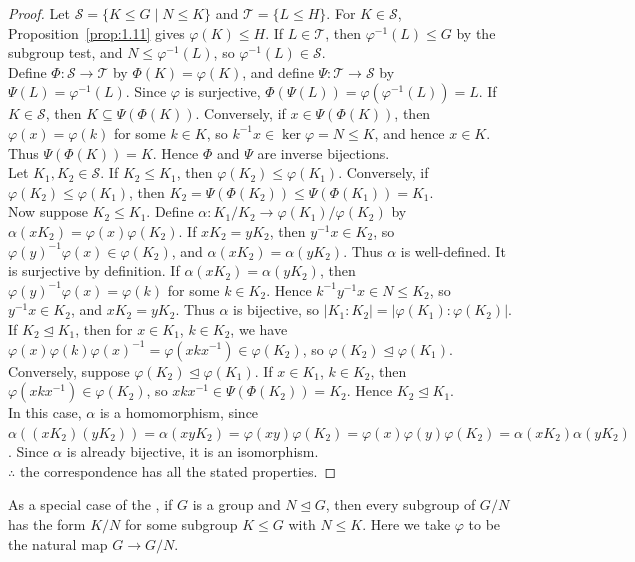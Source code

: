\documentclass[../Odyssey_Project.tex]{subfiles}
\begin{document}
\begin{proof}
    Let \(\mathcal{S} = \{K \leq G \mid N \leq K\}\) and \(\mathcal{T} = \{L \leq H\}\). For \(K \in \mathcal{S}\), Proposition~\ref{prop:1.11} gives \(\varphi(K) \leq H\). If \(L \in \mathcal{T}\), then \(\varphi^{-1}(L) \leq G\) by the subgroup test, and \(N \leq \varphi^{-1}(L)\), so \(\varphi^{-1}(L) \in \mathcal{S}\). \\
    Define \(\Phi \colon \mathcal{S} \to \mathcal{T}\) by \(\Phi(K) = \varphi(K)\), and define \(\Psi \colon \mathcal{T} \to \mathcal{S}\) by \(\Psi(L) = \varphi^{-1}(L)\). Since \(\varphi\) is surjective, \(\Phi(\Psi(L)) = \varphi(\varphi^{-1}(L)) = L\). If \(K \in \mathcal{S}\), then \(K \subseteq \Psi(\Phi(K))\). Conversely, if \(x \in \Psi(\Phi(K))\), then \(\varphi(x) = \varphi(k)\) for some \(k \in K\), so \(k^{-1}x \in \ker\varphi = N \leq K\), and hence \(x \in K\). Thus \(\Psi(\Phi(K)) = K\). Hence \(\Phi\) and \(\Psi\) are inverse bijections. \\
    Let \(K_1,K_2 \in \mathcal{S}\). If \(K_2 \leq K_1\), then \(\varphi(K_2) \leq \varphi(K_1)\). Conversely, if \(\varphi(K_2) \leq \varphi(K_1)\), then \(K_2 = \Psi(\Phi(K_2)) \leq \Psi(\Phi(K_1)) = K_1\). \\
    Now suppose \(K_2 \leq K_1\). Define \(\alpha \colon K_1/K_2 \to \varphi(K_1)/\varphi(K_2)\) by \(\alpha(xK_2) = \varphi(x)\varphi(K_2)\). If \(xK_2 = yK_2\), then \(y^{-1}x \in K_2\), so \(\varphi(y)^{-1}\varphi(x) \in \varphi(K_2)\), and \(\alpha(xK_2) = \alpha(yK_2)\). Thus \(\alpha\) is well-defined. It is surjective by definition. If \(\alpha(xK_2) = \alpha(yK_2)\), then \(\varphi(y)^{-1}\varphi(x) = \varphi(k)\) for some \(k \in K_2\). Hence \(k^{-1}y^{-1}x \in N \leq K_2\), so \(y^{-1}x \in K_2\), and \(xK_2 = yK_2\). Thus \(\alpha\) is bijective, so \(|K_1:K_2| = |\varphi(K_1):\varphi(K_2)|\). \\
    If \(K_2 \trianglelefteq K_1\), then for \(x \in K_1\), \(k \in K_2\), we have \(\varphi(x)\varphi(k)\varphi(x)^{-1} = \varphi(xkx^{-1}) \in \varphi(K_2)\), so \(\varphi(K_2) \trianglelefteq \varphi(K_1)\). Conversely, suppose \(\varphi(K_2) \trianglelefteq \varphi(K_1)\). If \(x \in K_1\), \(k \in K_2\), then \(\varphi(xkx^{-1}) \in \varphi(K_2)\), so \(xkx^{-1} \in \Psi(\Phi(K_2)) = K_2\). Hence \(K_2 \trianglelefteq K_1\). \\
    In this case, \(\alpha\) is a homomorphism, since \(\alpha((xK_2)(yK_2)) = \alpha(xyK_2) = \varphi(xy)\varphi(K_2) = \varphi(x)\varphi(y)\varphi(K_2) = \alpha(xK_2)\alpha(yK_2)\). Since \(\alpha\) is already bijective, it is an isomorphism. \\
    \(\therefore\) the correspondence has all the stated properties.
\end{proof}
\smallskip
\noindent As a special case of the , if \(G\) is a group and \(N \trianglelefteq G\), then every subgroup of \(G/N\) has the form \(K/N\) for some subgroup \(K \leq G\) with \(N \leq K\). Here we take \(\varphi\) to be the natural map \(G \to G/N\).
\end{document}
